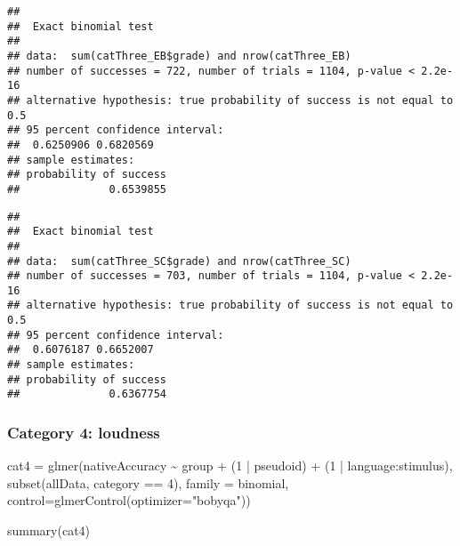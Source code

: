 \documentclass[
]{article}
\newenvironment{Shaded}{\begin{snugshade}}{\end{snugshade}}
\newcommand{\AttributeTok}[1]{\textcolor[rgb]{0.77,0.63,0.00}{#1}}
\newcommand{\DecValTok}[1]{\textcolor[rgb]{0.00,0.00,0.81}{#1}}
\newcommand{\FunctionTok}[1]{\textcolor[rgb]{0.00,0.00,0.00}{#1}}
\newcommand{\NormalTok}[1]{#1}
\newcommand{\OtherTok}[1]{\textcolor[rgb]{0.56,0.35,0.01}{#1}}
\newcommand{\SpecialCharTok}[1]{\textcolor[rgb]{0.00,0.00,0.00}{#1}}
\newcommand{\StringTok}[1]{\textcolor[rgb]{0.31,0.60,0.02}{#1}}
\begin{document}
\begin{verbatim}
## 
##  Exact binomial test
## 
## data:  sum(catThree_EB$grade) and nrow(catThree_EB)
## number of successes = 722, number of trials = 1104, p-value < 2.2e-16
## alternative hypothesis: true probability of success is not equal to 0.5
## 95 percent confidence interval:
##  0.6250906 0.6820569
## sample estimates:
## probability of success 
##              0.6539855
\end{verbatim}

\begin{Shaded}
\end{Shaded}

\begin{verbatim}
## 
##  Exact binomial test
## 
## data:  sum(catThree_SC$grade) and nrow(catThree_SC)
## number of successes = 703, number of trials = 1104, p-value < 2.2e-16
## alternative hypothesis: true probability of success is not equal to 0.5
## 95 percent confidence interval:
##  0.6076187 0.6652007
## sample estimates:
## probability of success 
##              0.6367754
\end{verbatim}

\hypertarget{category-4-loudness}{%
\subsubsection{Category 4: loudness}\label{category-4-loudness}}

\begin{Shaded}
\begin{Highlighting}[]
\NormalTok{cat4 }\OtherTok{=} \FunctionTok{glmer}\NormalTok{(nativeAccuracy }\SpecialCharTok{\textasciitilde{}}\NormalTok{ group }\SpecialCharTok{+}
\NormalTok{        (}\DecValTok{1} \SpecialCharTok{|}\NormalTok{ pseudoid) }\SpecialCharTok{+}\NormalTok{ (}\DecValTok{1} \SpecialCharTok{|}\NormalTok{ language}\SpecialCharTok{:}\NormalTok{stimulus),}
      \FunctionTok{subset}\NormalTok{(allData, category }\SpecialCharTok{==} \DecValTok{4}\NormalTok{),}
      \AttributeTok{family =}\NormalTok{ binomial,}
      \AttributeTok{control=}\FunctionTok{glmerControl}\NormalTok{(}\AttributeTok{optimizer=}\StringTok{"bobyqa"}\NormalTok{))}

\FunctionTok{summary}\NormalTok{(cat4)}
\end{Highlighting}
\end{Shaded}
\end{document}
